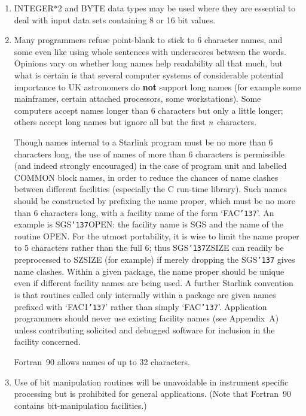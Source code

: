 \documentclass[twoside,11pt]{article}
\renewcommand{\_}{{\tt\char'137}}
\begin{document}
\begin{enumerate}

\item INTEGER*2 and BYTE data types may be used where they are essential to
deal with input data sets containing 8 or 16 bit values.

\item Many programmers refuse point-blank to stick to 6 character
names, and some even like using
whole sentences with underscores between the words.  Opinions vary
on whether long names help readability all that much, but what is
certain is that several computer systems of considerable potential
importance to UK astronomers do {\bf not} support long
names (for example some mainframes,
certain attached processors, some workstations).  Some
computers accept names longer than 6 characters
but only a little longer; others
accept long names but ignore all but the first {\it n}\, characters.

Though names internal to a Starlink program must be no more than 6 characters
long, the use of names of more than 6 characters is permissible (and indeed
strongly encouraged) in the case of program unit and
labelled COMMON block names, in
order to reduce the chances of name clashes between different facilities
(especially the C run-time library).
Such names should be constructed by prefixing the name proper, which must be
no more than 6 characters long, with a facility name of the form `FAC\_'.
An example is SGS\_OPEN: the facility name is SGS and the name of the routine
OPEN.
For the utmost portability,
it is wise to limit the name proper to 5 characters
rather than the full 6; thus SGS\_ZSIZE can readily be preprocessed to SZSIZE
(for example) if merely dropping the SGS\_ gives name clashes.  Within a
given package, the name proper should be unique even if different
facility names are being used.
A further Starlink convention is that routines called only internally within a
package are given names prefixed with `FAC1\_' rather than simply `FAC\_'.
Application programmers should never use existing
facility names (see Appendix~A) unless contributing solicited
and debugged software for inclusion in the facility concerned.

Fortran~90 allows names of up to 32 characters.

\item Use of bit manipulation routines will be unavoidable in instrument
specific processing but is prohibited for general applications.  (Note
that Fortran~90 contains bit-manipulation facilities.)


\end{enumerate}
\end{document}
